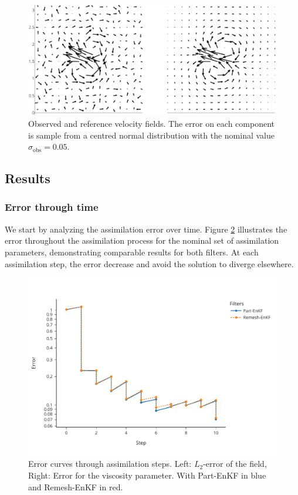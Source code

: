\begin{figure}[htbp]
	\centering
	\includegraphics[width=0.8\linewidth]{images/app2d/velocity_ref_recadre.pdf}
	\caption{Observed and reference velocity fields. The error on each component is sample from a centred normal distribution with the nominal value $\sigma_{\text{obs}} = 0.05$.}
	\label{fig:velocity}
\end{figure}

\newpage

\subsection{Results}

\subsubsection{Error through time}

We start by analyzing the assimilation error over time. Figure \ref{fig:assim_time} illustrates the error throughout the assimilation process for the nominal set of assimilation parameters, demonstrating comparable results for both filters. At each assimilation step, the error decrease and avoid the solution to diverge elsewhere.

\begin{figure}[htbp]
	\centering
	\includegraphics*[width=0.7\linewidth]{images/app2d/final/error_in_time.pdf}
	\caption{Error curves through assimilation steps. Left: \(L_2\)-error of the field, Right: Error for the viscosity parameter. With Part-EnKF in blue and Remesh-EnKF in red.}
	\label{fig:assim_time}
\end{figure}

